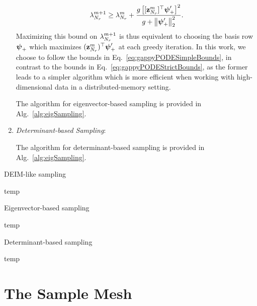 \begin{enumerate}
	\begin{equation}\label{eq:gappyPODESimpleBounds}
		\lambda_{N_r}^{m+1} \ge \lambda_{N_r}^{m} + \frac{g \left[ [\mathbf{z}_{N_r}^{m}]^\top \boldsymbol{\psi}'_+ \right]^2}{g + \left\Vert \boldsymbol{\psi}'_+ \right\Vert_2^2}.
	\end{equation}
	Maximizing this bound on $\lambda_{N_r}^{m+1}$ is thus equivalent to choosing the basis row $\boldsymbol{\psi}_+$ which maximizes $(\mathbf{z}_{N_r}^{m})^\top \boldsymbol{\psi}'_+$ at each greedy iteration. In this work, we choose to follow the bounds in Eq.~\ref{eq:gappyPODESimpleBounds}, in contrast to the bounds in Eq.~\ref{eq:gappyPODEStrictBounds}, as the former leads to a simpler algorithm which is more efficient when working with high-dimensional data in a distributed-memory setting.

	The algorithm for eigenvector-based sampling is provided in Alg.~\ref{alg:eigSampling}.

	\item \textit{Determinant-based Sampling}:

	The algorithm for determinant-based sampling is provided in Alg.~\ref{alg:eigSampling}.

\end{enumerate}

\begin{algorithm}
	\caption{DEIM-like sampling}\label{alg:deimSampling}
	\begin{algorithmic}
		\STATE temp
	\end{algorithmic}
\end{algorithm}

\begin{algorithm}
    \caption{Eigenvector-based sampling}\label{alg:eigSampling}
    \begin{algorithmic}
		\STATE temp
    \end{algorithmic}
\end{algorithm}

\begin{algorithm}
    \caption{Determinant-based sampling}\label{alg:detSampling}
    \begin{algorithmic}
		\STATE temp
    \end{algorithmic}
\end{algorithm}

\section{The Sample Mesh}\label{subsec:sampleMesh}

